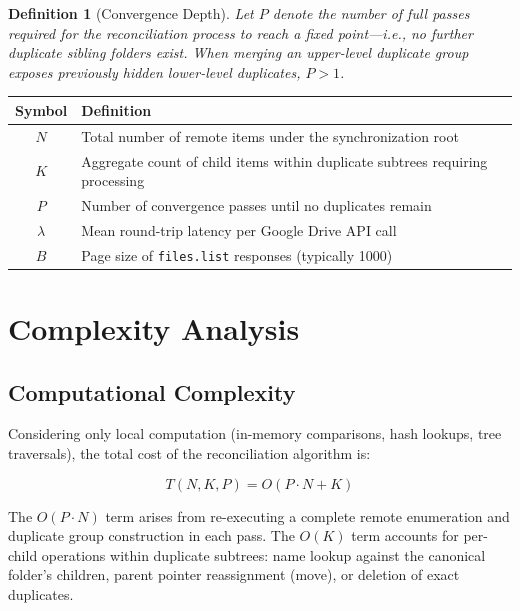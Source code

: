 \documentclass[12pt,a4paper]{article}
\newtheorem{definition}{Definition}
\begin{document}
\begin{definition}[Convergence Depth]
Let $P$ denote the number of full passes required for the reconciliation process to reach a fixed point---i.e., no further duplicate sibling folders exist. When merging an upper-level duplicate group exposes previously hidden lower-level duplicates, $P > 1$.
\end{definition}

\begin{center}
\begin{tabular}{c p{10cm}}
\toprule
\textbf{Symbol} & \textbf{Definition} \\
\midrule
$N$ & Total number of remote items under the synchronization root \\
$K$ & Aggregate count of child items within duplicate subtrees requiring processing \\
$P$ & Number of convergence passes until no duplicates remain \\
$\lambda$ & Mean round-trip latency per Google Drive API call \\
$B$ & Page size of \texttt{files.list} responses (typically 1000) \\
\bottomrule
\end{tabular}
\end{center}


\section{Complexity Analysis}
\label{sec:analysis}

\subsection{Computational Complexity}

Considering only local computation (in-memory comparisons, hash lookups, tree traversals), the total cost of the reconciliation algorithm is:

\begin{equation}
T(N, K, P) = O(P \cdot N + K)
\label{eq:time}
\end{equation}

The $O(P \cdot N)$ term arises from re-executing a complete remote enumeration and duplicate group construction in each pass. The $O(K)$ term accounts for per-child operations within duplicate subtrees: name lookup against the canonical folder's children, parent pointer reassignment (move), or deletion of exact duplicates.
\end{document}
